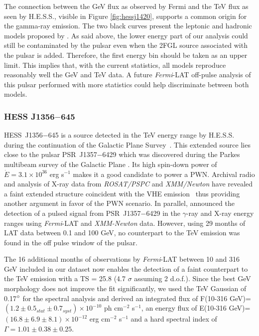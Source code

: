 The connection between the GeV flux as observed by Fermi and the TeV flux as seen by H.E.S.S., visible in Figure \ref{fig:hessj1420}, supports a common origin for the gamma-ray emission. The two black curves present the leptonic and hadronic models proposed by \cite{2010ApJ...711.1168V}. As said above, the lower energy part of our analysis could still be contaminated by the pulsar even when the 2FGL source associated with the pulsar is added. Therefore, the first energy bin should be taken as an upper limit. This implies that, with the current statistics, all models reproduce reasonably well the GeV and TeV data. A future \emph{Fermi}-LAT off-pulse analysis of this pulsar performed with more statistics could help discriminate between both models.


\subsubsection*{HESS J1356$-$645}

HESS~J1356$-$645 is a source detected in the TeV energy range by H.E.S.S. during the continuation of the Galactic Plane Survey~\citep{2011AA...533A.103H}. This extended source lies close to the pulsar PSR~J1357$-$6429 which was discovered during the Parkes multibeam survey of the Galactic Plane \citep{2004ApJ...611L..25C}. Its high spin-down power of $\dot{E} = 3.1 \times 10^{36}$ erg s$^{-1}$ makes it a good candidate to power a PWN. Archival radio and analysis of X-ray data from \emph{ROSAT/PSPC} and \emph{XMM/Newton} have revealed a faint extended structure coincident with the VHE emission~\citep{2011AA...533A.103H} thus providing another argument in favor of the PWN scenario. In parallel, \cite{2011AA...533A.102L} announced the detection of a pulsed signal from PSR~J1357$-$6429 in the $\gamma$-ray and X-ray energy ranges using \emph{Fermi}-LAT and \emph{XMM-Newton} data. However, using 29 months of LAT data between 0.1 and 100 GeV, no counterpart to the TeV emission was found in the off pulse window of the pulsar.

The 16 additional months of observations by \emph{Fermi}-LAT between 10 and 316 GeV included in our dataset now enables the detection of a faint counterpart to the TeV emission with a TS = 25.8 (4.7 $\sigma$ assuming 2 d.o.f.). Since the best GeV morphology does not improve the fit significantly, we used the TeV Gaussian of 0.17$\mbox{$^\circ$}$ \citep{2011AA...533A.103H} for the spectral analysis and derived an integrated flux of F(10-316 GeV)=$(1.2 \pm 0.5_{stat} \pm 0.7_{syst}) \times 10^{-10}$ ph cm$^{-2}$ s$^{-1}$, an energy flux of E(10-316 GeV)=$(16.8 \pm 6.9 \pm 8.1) \times 10^{-12}$ erg cm$^{-2}$ s$^{-1}$ and a hard spectral index of $\Gamma = 1.01 \pm 0.38 \pm 0.25$. 

